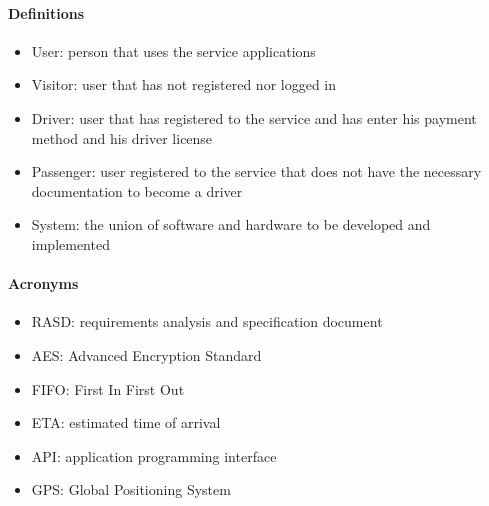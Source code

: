 \paragraph{Definitions}
\begin{itemize}
	\item User: person that uses the service applications
	\item Visitor: user that has not registered nor logged in
	\item Driver: user that has registered to the service and has enter his payment method and his driver license
	\item Passenger: user registered to the service that does not have the necessary documentation to become a driver
	\item System: the union of software and hardware to be developed and implemented
\end{itemize}
\paragraph{Acronyms}
\begin{itemize}
	\item RASD: requirements analysis and specification document
	\item AES: Advanced Encryption Standard
	\item FIFO: First In First Out
	\item ETA: estimated time of arrival
	\item API: application programming interface
	\item GPS: Global Positioning System
\end{itemize}